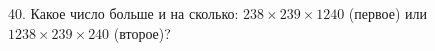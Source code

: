 40. Какое число больше и на сколько: $238\times239\times1240$ (первое) или $1238\times239\times240$ (второе)?\\
